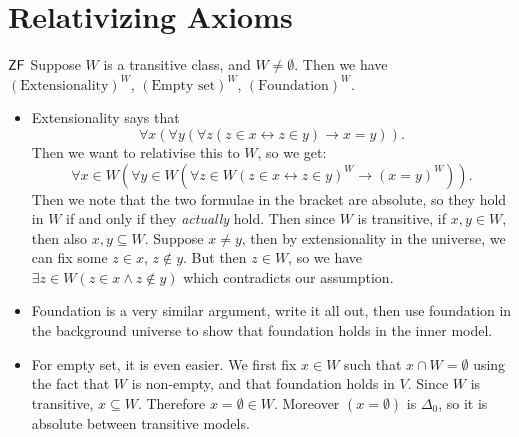 \documentclass{article}
\begin{document}
\section{Relativizing Axioms}
\begin{fancylem}{$\mathsf{ZF}$}
    Suppose $W$ is a transitive class, and $W \neq \emptyset$. Then we have $(\text{Extensionality})^{W}$, $(\text{Empty set})^{W}$, $(\text{Foundation})^{W}$.
\end{fancylem}
\proof \hspace{0.1cm} \begin{itemize}
    \item Extensionality says that \[ \forall x( \forall y ( \forall z ( z \in x \leftrightarrow z \in y) \rightarrow x = y)).\]
          Then we want to relativise this to $W$, so we get: \[\forall x \in W( \forall y \in W ( \forall z \in W ( z \in x \leftrightarrow z \in y)^{W} \rightarrow (x = y)^{W})).\]
          Then we note that the two formulae in the bracket are absolute, so they hold in $W$ if and only if they \textit{actually} hold. Then since $W$ is transitive, if $x, y \in W$, then also $x,y \subseteq W$. Suppose $x \neq y$, then by extensionality in the universe, we can fix some $z \in x$, $z \notin y$. But then $z \in W$, so we have $\exists z \in W ( z \in x \wedge z \notin y)$ which contradicts our assumption.
    \item Foundation is a very similar argument, write it all out, then use foundation in the background universe to show that foundation holds in the inner model.
    \item For empty set, it is even easier. We  first fix $x \in W$ such that $x \cap W = \emptyset$ using the fact that $W$ is non-empty, and that foundation holds in $V$. Since $W$ is transitive, $x \subseteq W$. Therefore $x = \emptyset \in W$. Moreover $(x=\emptyset)$ is $\Delta_{0}$, so it is absolute between transitive models.
\end{itemize}

\newlec
\end{document}
